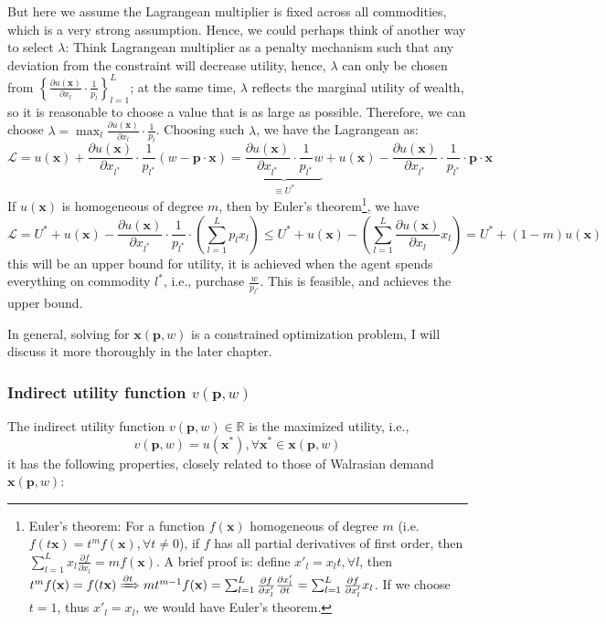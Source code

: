 But here we assume the Lagrangean multiplier is fixed across all commodities, which is a very strong assumption. Hence, we could perhaps think of another way to select $\lambda$: 
Think Lagrangean multiplier as a penalty mechanism such that any deviation from the constraint will decrease utility, hence, $\lambda$ can only be chosen from $\left\{\frac{\partial u(\mathbf{x})}{\partial x_l}\cdot\frac{1}{p_l} \right\}^L_{l=1}$; at the same time, $\lambda$ reflects the marginal utility of wealth, 
so it is reasonable to choose a value that is as large as possible. Therefore, we can choose $\lambda = \max_l \frac{\partial u(\mathbf{x})}{\partial x_l}\cdot \frac{1}{p_l}$. Choosing such $\lambda$, we have the Lagrangean as: $$ \mathcal{L} = u(\mathbf{x}) + \frac{\partial u(\mathbf{x})}{\partial x_{l^*}}\cdot\frac{1}{p_{l^*}}\left(w-\mathbf{p}\cdot\mathbf{x} \right) = \underbrace{\frac{\partial u(\mathbf{x})}{\partial x_{l^*}}\cdot\frac{1}{p_{l^*}}w}_{\equiv U^*} + u(\mathbf{x}) - \frac{\partial u(\mathbf{x})}{\partial x_{l^*}}\cdot\frac{1}{p_{l^*}}\cdot \mathbf{p}\cdot\mathbf{x}$$
If $u(\mathbf{x})$ is homogeneous of degree $m$, then by Euler's theorem\footnote{Euler's theorem: For a function $f(\mathbf{x})$ homogeneous of degree $m$ (i.e. $f(t\mathbf{x})=t^mf(\mathbf{x}),\forall t\neq 0$), if $f$ has all partial derivatives of first order, then $\sum^L_{l=1}x_l\frac{\partial f}{\partial x_l}=mf(\mathbf{x})$. A brief proof is: define $x'_l=x_l t,\forall l$, then $t^mf(\mathbf{x})=f(t\mathbf{x})\xRightarrow{\partial t} mt^{m-1}f(\mathbf{x})=\sum^L_{l=1}\frac{\partial f}{\partial x'_l}\frac{\partial x'_l}{\partial t}=\sum^L_{l=1}\frac{\partial f}{\partial x'_l}x_l$.
If we choose $t=1$, thus $x'_l=x_l$, we would have Euler's theorem.}, we have 
    $$\mathcal{L} = U^* +u(\mathbf{x})- \frac{\partial u(\mathbf{x})}{\partial x_{l^*}}\cdot\frac{1}{p_{l^*}}\cdot \left(\sum_{l=1}^L p_lx_l \right) \leq U^* + u(\mathbf{x})- \left(\sum_{l=1}^L \frac{\partial u(\mathbf{x})}{\partial x_{l}} x_l\right) = U^* +(1-m)u(\mathbf{x})$$
this will be an upper bound for utility, it is achieved when the agent spends everything on commodity $l^*$, i.e., purchase $\frac{w}{p_{l^*}}$. This is feasible, and achieves the upper bound.

In general, solving for $\mathbf{x}(\mathbf{p},w)$ is a constrained optimization problem, I will discuss it more thoroughly in the later chapter.

\subsubsection*{Indirect utility function $v(\mathbf{p},w)$}
The indirect utility function $v(\mathbf{p},w)\in \mathbb{R}$ is the maximized utility, i.e., 
$$v(\mathbf{p},w)=u(\mathbf{x}^*),\forall \mathbf{x}^*\in \mathbf{x}(\mathbf{p},w)$$
it has the following properties, closely related to those of Walrasian demand $\mathbf{x}(\mathbf{p},w)$:


